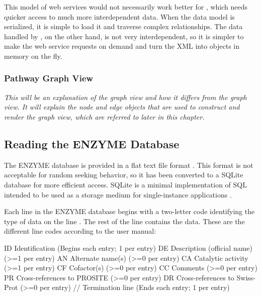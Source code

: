 This model of web services would not necessarily work better for \mawapp,
which needs quicker access to much more interdependent data. When the data model
is serialized, it is simple to load it and traverse complex relationships. The
data handled by \keggapp, on the other hand, is not very interdependent, so
it is simpler to make the web service requests on demand and turn the XML into
objects in memory on the fly.

\subsubsection{Pathway Graph View}
\label{sect:kegg_impl_graph_view}

\emph{This will be an explanation of the \keggapp graph view and how it differs
from the \mawapp graph view. It will explain the node and edge objects that are
used to construct and render the graph view, which are referred to later in this
chapter.}

\subsection{Reading the ENZYME Database}
\label{sect:kegg_impl_enzyme}

The ENZYME database is provided in a flat text file format
\cite{enzyme:enzuser}.  This format is not acceptable for random seeking
behavior, so it has been converted to a SQLite database \cite{sqlite:main} for
more efficient access.  SQLite is a minimal implementation of SQL intended to be
used as a storage medium for single-instance applications \cite{sqlite:main}.

Each line in the ENZYME database begins with a two-letter code identifying the
type of data on the line \cite{enzyme:enzuser}. The rest of the line contains
the data. These are the different line codes according to the user manual:

\begin{objc}
ID  Identification                         (Begins each entry;
                                            1 per entry)
DE  Description (official name)            (>=1 per entry)
AN  Alternate name(s)                      (>=0 per entry)
CA  Catalytic activity                     (>=1 per entry)
CF  Cofactor(s)                            (>=0 per entry)
CC  Comments                               (>=0 per entry)
PR  Cross-references to PROSITE            (>=0 per entry)
DR  Cross-references to Swiss-Prot         (>=0 per entry)
//  Termination line                       (Ends each entry;
                                            1 per entry)
\end{objc}


